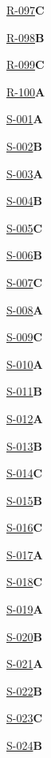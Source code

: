 \noindent\hyperref[q:R-097]{R-097}\hfill\textbf{C}\par
\noindent\hyperref[q:R-098]{R-098}\hfill\textbf{B}\par
\noindent\hyperref[q:R-099]{R-099}\hfill\textbf{C}\par
\noindent\hyperref[q:R-100]{R-100}\hfill\textbf{A}\par
\noindent\hyperref[q:S-001]{S-001}\hfill\textbf{A}\par
\noindent\hyperref[q:S-002]{S-002}\hfill\textbf{B}\par
\noindent\hyperref[q:S-003]{S-003}\hfill\textbf{A}\par
\noindent\hyperref[q:S-004]{S-004}\hfill\textbf{B}\par
\noindent\hyperref[q:S-005]{S-005}\hfill\textbf{C}\par
\noindent\hyperref[q:S-006]{S-006}\hfill\textbf{B}\par
\noindent\hyperref[q:S-007]{S-007}\hfill\textbf{C}\par
\noindent\hyperref[q:S-008]{S-008}\hfill\textbf{A}\par
\noindent\hyperref[q:S-009]{S-009}\hfill\textbf{C}\par
\noindent\hyperref[q:S-010]{S-010}\hfill\textbf{A}\par
\noindent\hyperref[q:S-011]{S-011}\hfill\textbf{B}\par
\noindent\hyperref[q:S-012]{S-012}\hfill\textbf{A}\par
\noindent\hyperref[q:S-013]{S-013}\hfill\textbf{B}\par
\noindent\hyperref[q:S-014]{S-014}\hfill\textbf{C}\par
\noindent\hyperref[q:S-015]{S-015}\hfill\textbf{B}\par
\noindent\hyperref[q:S-016]{S-016}\hfill\textbf{C}\par
\noindent\hyperref[q:S-017]{S-017}\hfill\textbf{A}\par
\noindent\hyperref[q:S-018]{S-018}\hfill\textbf{C}\par
\noindent\hyperref[q:S-019]{S-019}\hfill\textbf{A}\par
\noindent\hyperref[q:S-020]{S-020}\hfill\textbf{B}\par
\noindent\hyperref[q:S-021]{S-021}\hfill\textbf{A}\par
\noindent\hyperref[q:S-022]{S-022}\hfill\textbf{B}\par
\noindent\hyperref[q:S-023]{S-023}\hfill\textbf{C}\par
\noindent\hyperref[q:S-024]{S-024}\hfill\textbf{B}\par
